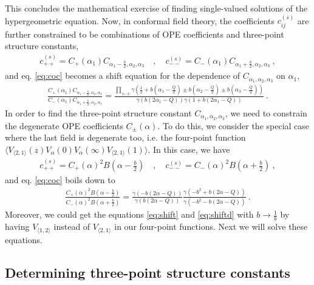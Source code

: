 \documentclass[12pt, a4paper]{article}
\theoremstyle{break}
\begin{document}
This concludes the mathematical exercise of finding single-valued solutions of the hypergeometric equation. 
Now, in conformal field theory, the coefficients $c^{(s)}_{ij}$ are further constrained to be combinations of OPE coefficients and three-point structure constants, 
\begin{align}
 c_{++}^{(s)} = C_+(\alpha_1) C_{\alpha_1-\frac{b}{2},\alpha_2,\alpha_3} 
\quad , \quad 
c_{--}^{(s)}  = C_-(\alpha_1) C_{\alpha_1+\frac{b}{2},\alpha_2,\alpha_3}\ ,
\label{cs}
\end{align}
and eq. \eqref{eq:coc} becomes a shift equation for the dependence of $C_{\alpha_1,\alpha_2,\alpha_3}$ on $\alpha_1$,
\begin{align}
 \frac{C_+(\alpha_1) C_{\alpha_1-\frac{b}{2},\alpha_2,\alpha_3} }{C_-(\alpha_1) C_{\alpha_1+\frac{b}{2},\alpha_2,\alpha_3}} = \frac{\prod_{\pm,\pm} \gamma(\frac12 +b(\alpha_1-\frac{Q}{2}) \pm b(\alpha_2-\frac{Q}{2}) \pm b(\alpha_3-\frac{Q}{2}))}{\gamma(b(2\alpha_1-Q)) \gamma(1+b(2\alpha_1-Q))}\ .
 \label{eq:shift}
\end{align}
In order to find the three-point structure constant $C_{\alpha_1,\alpha_2,\alpha_3}$, we need to constrain the degenerate OPE coefficients $C_\pm(\alpha)$. To do this, we consider the special case where the last field is degenerate too, i.e. the four-point function $\Big\langle V_{\langle 2,1 \rangle}(z) V_\alpha(0) V_{\alpha}(\infty) V_{\langle 2,1 \rangle}(1)\Big\rangle$.
In this case, we have
\begin{align}
 c_{++}^{(s)} = C_+(\alpha)^2 B(\alpha-\tfrac{b}{2}) \quad , \quad c_{--}^{(s)} = C_-(\alpha)^2B(\alpha+\tfrac{b}{2}) \ ,
\end{align}
and eq. \eqref{eq:coc} boils down to 
\begin{align}
 \frac{C_+(\alpha)^2 B(\alpha-\tfrac{b}{2})}{C_-(\alpha)^2B(\alpha+\tfrac{b}{2})} 
 =  \frac{\gamma(-b(2\alpha-Q))}{\gamma(b(2\alpha-Q))} 
 \frac{\gamma(-b^2+b(2\alpha-Q))}{\gamma(-b^2-b(2\alpha-Q))} \ .
 \label{eq:shiftd}
\end{align}
Moreover, we could get the equations \eqref{eq:shift} and \eqref{eq:shiftd} with $b\to \frac{1}{b}$ by having $V_{\langle 1,2\rangle}$ instead of $V_{\langle 2,1\rangle}$ in our four-point functions. Next we will solve these equations. 


\subsection{Determining three-point structure constants}
\end{document}
